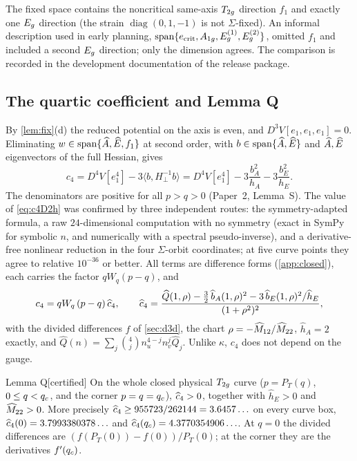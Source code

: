 \begin{remark}\label{rem:fixspace}
The fixed space contains the noncritical same-axis $T_{2g}$ direction $f_1$ and exactly one $E_{g}$ direction (the
strain $\operatorname{diag}(0,1,-1)$ is not $\Sigma$-fixed). An informal description used in early planning,
$\operatorname{span}\{e_{\mathrm{crit}},A_{1g},E_{g}^{(1)},E_{g}^{(2)}\}$, omitted $f_1$ and included a second $E_{g}$ direction; only the
dimension agrees. The comparison is recorded in the development documentation of the release package.
\end{remark}

\subsection{The quartic coefficient and Lemma Q}

By \cref{lem:fix}(d) the reduced potential on the axis is even, and $D^3V[e_1,e_1,e_1]=0$. Eliminating
$w\in\operatorname{span}\{\widehat{A},\widehat{E},f_1\}$ at second order, with $b\in\operatorname{span}\{\widehat{A},\widehat{E}\}$ and $\widehat{A},\widehat{E}$ eigenvectors of the full
Hessian, gives
\begin{equation}\label{eq:c4D2h}
c_4=D^4V[e_1^4]-3\langle b,H_\perp^{-1}b\rangle=D^4V[e_1^4]-3\frac{b_A^2}{h_A}-3\frac{b_E^2}{h_E}.
\end{equation}
The denominators are positive for all $p>q>0$ (Paper~2, Lemma~S). The value of \eqref{eq:c4D2h} was confirmed by three
independent routes: the symmetry-adapted formula, a raw $24$-dimensional computation with no symmetry (exact in
SymPy \citep{SymPy2017} for symbolic $n$, and numerically with a spectral pseudo-inverse), and a derivative-free
nonlinear reduction in the four $\Sigma$-orbit coordinates; at five curve points they agree to relative $10^{-36}$ or
better. All terms are difference forms (\cref{app:closed}), each carries the factor $qW_q(p-q)$, and
\begin{equation}\label{eq:c4fact}
c_4=qW_q\,(p-q)\,\widehat{c}_4,\qquad
\widehat{c}_4=\frac{\widehat Q(1,\rho)-\frac32\,\widehat b_A(1,\rho)^2-3\,\widehat b_E(1,\rho)^2/\widehat h_E}{(1+\rho^2)^2},
\end{equation}
with the divided differences $\hat f$ of \cref{sec:d3d}, the chart $\rho=-\widehat{M}_{12}/\widehat{M}_{22}$, $\widehat h_A=2$ exactly, and
$\widehat Q(n)=\sum_j\binom4j n_u^{4-j}n_v^j\widehat Q_j$. Unlike $\kappa$, $c_4$ does not depend on the gauge.

\begin{named}{Lemma Q}[certified]\label{lem:Q}
On the whole closed physical $T_{2g}$ curve ($p=P_T(q)$, $0\le q<q_{c}$, and the corner $p=q=q_{c}$), $\widehat{c}_4>0$, together with
$\widehat h_E>0$ and $\widehat{M}_{22}>0$. More precisely $\widehat{c}_4\ge955723/262144=3.6457\ldots$ on every curve box,
$\widehat{c}_4(0)=3.7993380378\ldots$ and $\widehat{c}_4(q_{c})=4.3770354906\ldots$. At $q=0$ the divided differences are
$(f(P_T(0))-f(0))/P_T(0)$; at the corner they are the derivatives $f'(q_{c})$.
\end{named}


